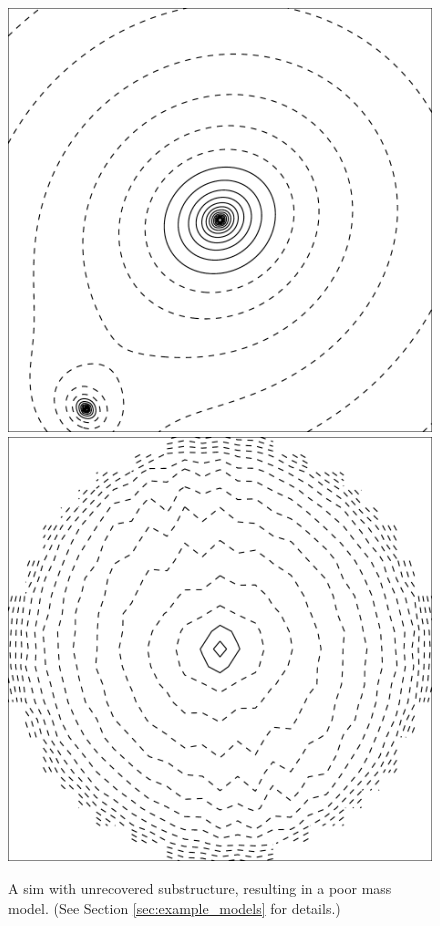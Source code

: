 \begin{figure}
  \includegraphics[width=\myplotswidth]{fig/ASW0000vqg_006937_kappa}
  \includegraphics[width=\myplotswidth]{fig/006937_mass}

  \caption[result 6937 (ASW0000vqg)]{A sim with unrecovered
    substructure, resulting in a poor mass model. (See Section
    \ref{sec:example_models} for details.)}
  \label{fig:6937}
\end{figure}

